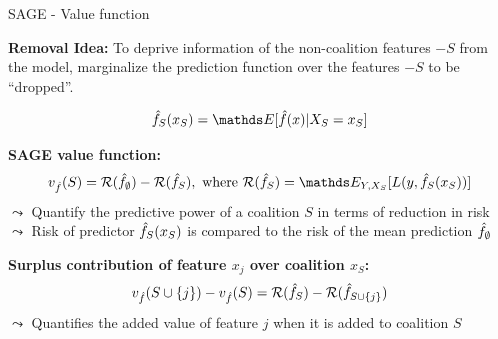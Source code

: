 \documentclass[11pt,compress,t,notes=noshow, aspectratio=169, xcolor=table]{beamer}
\begin{document}
\begin{frame}{SAGE - Value function}
  
 \textbf{Removal Idea:} %
 To deprive information of the non-coalition features $-S$ from the model, marginalize the prediction function over the features $-S$ to be ``dropped''.

$$\fh_S(x_S) = \E[\fh(x) | X_S = x_S]$$



\pause
\lz

\textbf{SAGE value function:}  $$v_{\fh}(S) = \risk(\fh_{\emptyset}) - \risk(\fh_{S}), \text{ where } \risk(\fh_{S}) = \E_{Y, X_S}[L(y, \fh_S(x_S))]$$
$\leadsto$ Quantify the predictive power of a coalition $S$ in terms of reduction in risk \\
$\leadsto$ Risk of predictor $\fh_S(x_S)$ is compared to the risk of the mean prediction $\fh_{\emptyset}$


\pause
\lz

\textbf{Surplus contribution of feature $x_j$ over coalition $x_S$:}  
$$v_{\fh}(S \cup \{j\}) - v_{\fh}(S) = \risk(\fh_{S})-\risk(\fh_{S \cup \{j\}})$$
$\leadsto$ Quantifies the added value of feature $j$ when it is added to coalition $S$


\end{frame}
\end{document}
